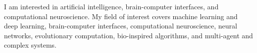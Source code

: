 

\begin{cvparagraph}

I am interested in artificial intelligence, brain-computer interfaces, and computational neuroscience. My field of interest covers machine learning and deep learning, brain-computer interfaces, computational neuroscience, neural networks, evolutionary computation, bio-inspired algorithms, and multi-agent and complex systems.
\end{cvparagraph}

